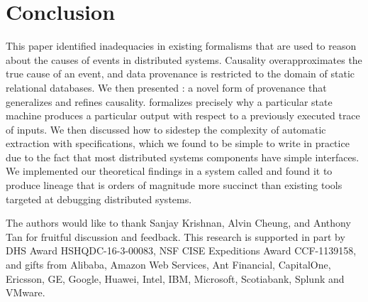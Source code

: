 

\section{Conclusion}
This paper identified inadequacies in existing formalisms that are used to
reason about the causes of events in distributed systems. Causality
overapproximates the true cause of an event, and data provenance is restricted
to the domain of static relational databases.  We then presented
\watprovenance{}: a novel form of provenance that generalizes \whyprovenance{}
and refines causality. \Watprovenance{} formalizes precisely why a particular
state machine produces a particular output with respect to a previously
executed trace of inputs. We then discussed how to sidestep the complexity of
automatic \watprovenance{} extraction with \watprovenance{} specifications,
which we found to be simple to write in practice due to the fact that most
distributed systems components have simple interfaces. We implemented our
theoretical findings in a system called \fluent{} and found it to produce
lineage that is orders of magnitude more succinct than existing tools targeted
at debugging distributed systems.

\begin{acks}
  The authors would like to thank Sanjay Krishnan, Alvin Cheung, and Anthony
  Tan for fruitful discussion and feedback.
  This research is supported in part by DHS Award HSHQDC-16-3-00083, NSF CISE
  Expeditions Award CCF-1139158, and gifts from Alibaba, Amazon Web Services, Ant
  Financial, CapitalOne, Ericsson, GE, Google, Huawei, Intel, IBM, Microsoft,
  Scotiabank, Splunk and VMware.
\end{acks}
